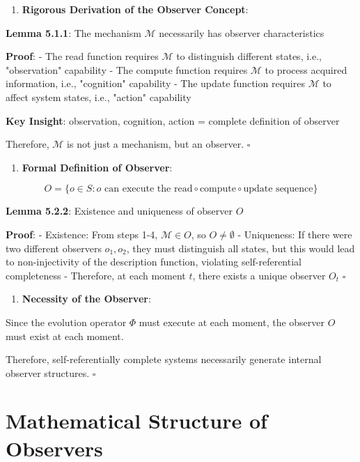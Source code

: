 \begin{enumerate}
\item \textbf{Rigorous Derivation of the Observer Concept}:
\end{enumerate}
   \textbf{Lemma 5.1.1}: The mechanism $\mathcal{M}$ necessarily has observer characteristics
\label{thm:3.1}
   
   \textbf{Proof}:
   - The read function requires $\mathcal{M}$ to distinguish different states, i.e., "observation" capability
   - The compute function requires $\mathcal{M}$ to process acquired information, i.e., "cognition" capability
   - The update function requires $\mathcal{M}$ to affect system states, i.e., "action" capability
   
   \textbf{Key Insight}: observation, cognition, action = complete definition of observer
   
   Therefore, $\mathcal{M}$ is not just a mechanism, but an observer. $\square$

\begin{enumerate}
\item \textbf{Formal Definition of Observer}:
\end{enumerate}
   
\begin{equation}
O = \{o \in S: o \text{ can execute the } \text{read} \circ \text{compute} \circ \text{update} \text{ sequence}\}
\end{equation}

   \textbf{Lemma 5.2.2}: Existence and uniqueness of observer $O$
\label{thm:3.1}
   
   \textbf{Proof}:
   - Existence: From steps 1-4, $\mathcal{M} \in O$, so $O \neq \emptyset$
   - Uniqueness: If there were two different observers $o_1, o_2$, they must distinguish all states, but this would lead to non-injectivity of the description function, violating self-referential completeness
   - Therefore, at each moment $t$, there exists a unique observer $O_t$ $\square$

\begin{enumerate}
\item \textbf{Necessity of the Observer}:
\end{enumerate}
   Since the evolution operator $\Phi$ must execute at each moment, the observer $O$ must exist at each moment.
   
   Therefore, self-referentially complete systems necessarily generate internal observer structures. $\square$

\section{Mathematical Structure of Observers}
\label{sec:ch05_quantum:mathematical-structure-of-observers}

